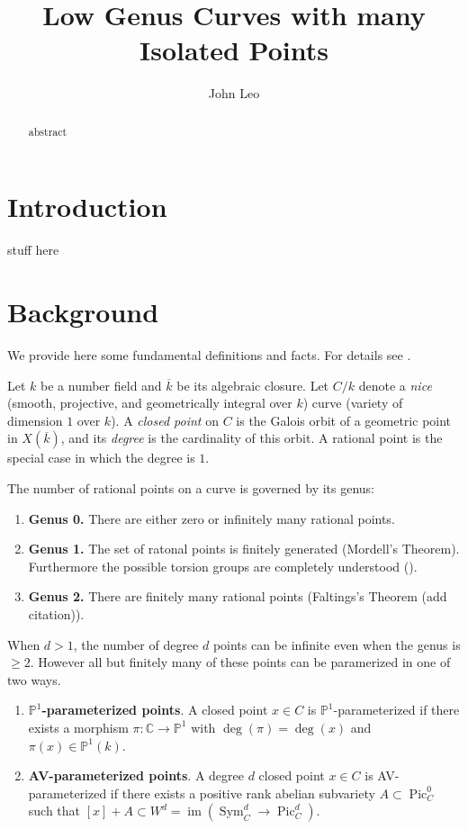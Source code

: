\documentclass[12pt, reqno]{amsart}
\title{Low Genus Curves with many Isolated Points}
\author{John Leo}
\newcommand{\PP}{{\mathbb P}}
\newcommand{\C}{{\mathbb C}}
\newcommand{\kbar}{{\overline{k}}}
\DeclareMathOperator{\im}{im}
\DeclareMathOperator{\Sym}{Sym}
\DeclareMathOperator{\Pic}{Pic}
\numberwithin{equation}{section}
\numberwithin{table}{section}
\begin{document}
\begin{abstract}
abstract
\end{abstract}

\maketitle

\section{Introduction}

stuff here

\section{Background}

We provide here some fundamental definitions and facts. For details
see \cite{Viray2024}.

Let $k$ be a number field and $\kbar$ be its
algebraic closure. Let $C/k$ denote a \textit{nice} (smooth,
projective, and geometrically integral over $k$) curve (variety of
dimension $1$ over $k$). A \textit{closed point} on $C$ is the Galois
orbit of a geometric point in $X(\kbar)$, and its \textit{degree} is
the cardinality of this orbit. A rational point is the special case in
which the degree is $1$.

The number of rational points on a curve is governed by its genus:
\begin{enumerate}
  \item \textbf{Genus 0.} There are either zero or infinitely many
    rational points.
  \item \textbf{Genus 1.} The set of ratonal points is finitely
    generated (Mordell's Theorem). Furthermore the possible
    torsion groups are completely understood (\cites{Mazur1977, Mazur1978}).
  \item \textbf{Genus 2.} There are finitely many rational points
    (Faltings's Theorem (add citation)).
\end{enumerate}

When $d > 1$, the number of degree $d$ points can be infinite even
when the genus is $\ge 2$. However all but finitely many of these
points can be paramerized in one of two ways.
\begin{enumerate}
  \item \textbf{$\PP^1$-parameterized points}. A closed point $x \in
    C$ is $\PP^1$-parameterized if there exists a morphism $\pi : \C \to \PP^1$ with
    $\deg(\pi) = \deg(x)$ and $\pi(x) \in \PP^1(k)$.

  \item \textbf{AV-parameterized points}. A degree $d$ closed point $x
    \in C$ is AV-parameterized if there exists a positive rank abelian
    subvariety $A \subset \Pic^0_C$ such that $[x] + A \subset W^d =
    \im(\Sym^d_C \to \Pic^d_C)$.
\end{enumerate}
\end{document}
